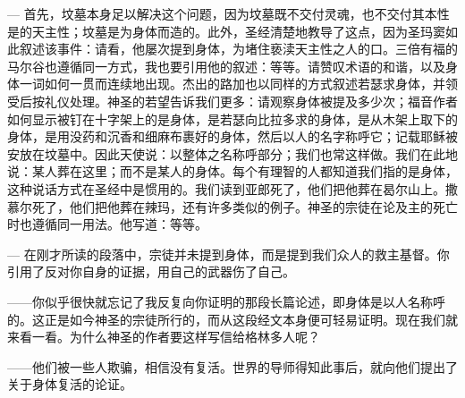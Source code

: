 — 首先，坟墓本身足以解决这个问题，因为坟墓既不交付灵魂，也不交付其本性是的天主性；坟墓是为身体而造的。此外，圣经清楚地教导了这点，因为圣玛窦如此叙述该事件：请看，他屡次提到身体，为堵住亵渎天主性之人的口。三倍有福的马尔谷也遵循同一方式，我也要引用他的叙述：等等。请赞叹术语的和谐，以及身体一词如何一贯而连续地出现。杰出的路加也以同样的方式叙述若瑟求身体，并领受后按礼仪处理。神圣的若望告诉我们更多：请观察身体被提及多少次；福音作者如何显示被钉在十字架上的是身体，是若瑟向比拉多求的身体，是从木架上取下的身体，是用没药和沉香和细麻布裹好的身体，然后以人的名字称呼它；记载耶稣被安放在坟墓中。因此天使说：以整体之名称呼部分；我们也常这样做。我们在此地说：某人葬在这里；而不是某人的身体。每个有理智的人都知道我们指的是身体，这种说话方式在圣经中是惯用的。我们读到亚郎死了，他们把他葬在曷尔山上。撒慕尔死了，他们把他葬在辣玛，还有许多类似的例子。神圣的宗徒在论及主的死亡时也遵循同一用法。他写道：等等。\par

— 在刚才所读的段落中，宗徒并未提到身体，而是提到我们众人的救主基督。你引用了反对你自身的证据，用自己的武器伤了自己。\par

——你似乎很快就忘记了我反复向你证明的那段长篇论述，即身体是以人名称呼的。这正是如今神圣的宗徒所行的，而从这段经文本身便可轻易证明。现在我们就来看一看。为什么神圣的作者要这样写信给格林多人呢？\par

——他们被一些人欺骗，相信没有复活。世界的导师得知此事后，就向他们提出了关于身体复活的论证。\par


